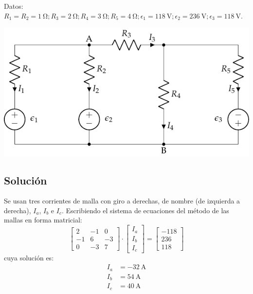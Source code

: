 Datos:
$R_1 = R_2 = \qty{1}{\ohm}; R_3 = \qty{2}{\ohm}; R_4 = \qty{3}{\ohm};
R_5=\qty{4}{\ohm}; \epsilon_1=\qty{118}{\volt}; \epsilon_2 =
\qty{236}{\volt}; \epsilon_3 = \qty{118}{\volt}$.

\begin{center}
  \includegraphics{figuras/mallas2.pdf}
\end{center}

\subsection*{Solución}
Se usan tres corrientes de malla con giro a derechas, de nombre (de
izquierda a derecha), $I_a$, $I_b$ e $I_c$. Escribiendo el sistema de
ecuaciones del método de las mallas en forma matricial:
\begin{equation*}
  \begin{bmatrix}
    2 & -1 & 0 \\
    -1 & 6 & -3 \\
    0 & -3 & 7
  \end{bmatrix}
  \cdot
  \begin{bmatrix}
    I_a\\
    I_b\\
    I_c
  \end{bmatrix}
  =
  \begin{bmatrix}
    -118\\
    236\\
    118
  \end{bmatrix}
\end{equation*}
cuya solución es:
\begin{align*}
  I_a &= \qty{-32}{\ampere}\\
  I_b &= \qty{54}{\ampere}\\
  I_c &= \qty{40}{\ampere}
\end{align*}


